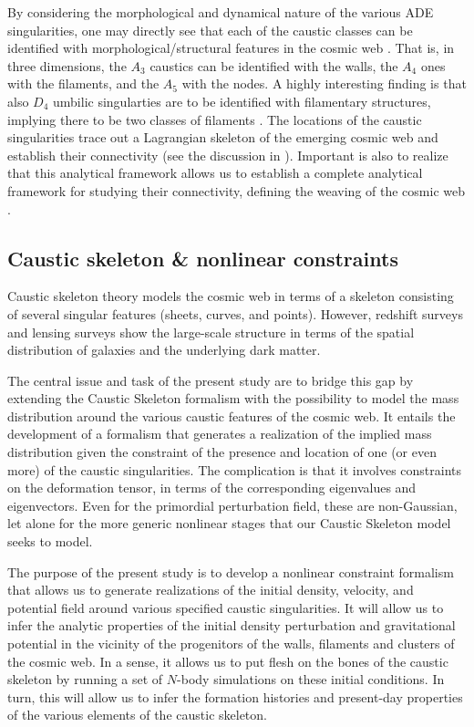 \documentclass[a4paper, 11pt]{article}
\begin{document}
By considering the morphological and dynamical nature of the various ADE singularities, one may directly see that each of the caustic classes can be identified with morphological/structural features in the cosmic web \cite{Feldbrugge:2018}. That is, in three dimensions, the $A_3$ caustics can be identified with the walls, the $A_4$ ones with the filaments, and the $A_5$ with the nodes. A highly interesting finding is that also $D_4$ umbilic singularties are to be identified with filamentary structures, implying there to be two classes of filaments \cite{Feldbrugge:2018}. The locations of the caustic singularities trace out a Lagrangian skeleton of the emerging cosmic web and establish their connectivity (see the discussion in \cite{Hidding:2014}). Important is also to realize that this analytical framework allows us to establish a complete analytical framework for studying their connectivity, defining the weaving of the cosmic web \cite{Zeldovich:1970,Bond:1996,Weygaert:1996,Aragon:2010a,Aragon:2010b,Cautun:2014}.

\subsection{Caustic skeleton \& nonlinear constraints}
Caustic skeleton theory models the cosmic web in terms of a skeleton consisting of several singular features (sheets, curves, and points). However, redshift surveys and lensing surveys show the large-scale structure in terms of the spatial distribution of galaxies and the underlying dark matter.

The central issue and task of the present study are to bridge this gap by extending the Caustic Skeleton formalism with the possibility to model the mass distribution around the various caustic features of the cosmic web. It entails the development of a formalism that generates a realization of the implied mass distribution given the constraint of the presence and location of one (or even more) of the caustic singularities. The complication is that it involves constraints on the deformation tensor, in terms of the corresponding eigenvalues and eigenvectors. Even for the primordial perturbation field, these are non-Gaussian, let alone for the more generic nonlinear stages that our Caustic Skeleton model seeks to model.

The purpose of the present study is to develop a nonlinear constraint formalism that allows us to generate realizations of the initial density, velocity, and potential field around various specified caustic singularities. It will allow us to infer the analytic properties of the initial density perturbation and gravitational potential in the vicinity of the progenitors of the walls, filaments and clusters of the cosmic web. In a sense, it allows us to put flesh on the bones of the caustic skeleton by running a set of $N$-body simulations on these initial conditions. In turn, this will allow us to infer the formation histories and present-day properties of the various elements of
the caustic skeleton. 
\end{document}
